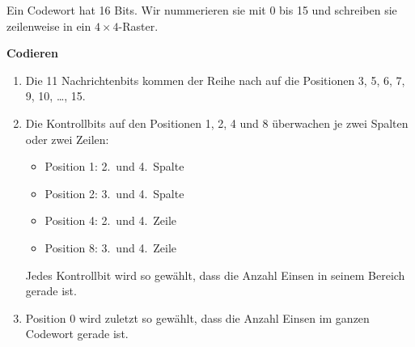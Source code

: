 \begin{myprocedure}\label{proc:hamming}
    Ein Codewort hat 16 Bits. Wir nummerieren sie mit 0 bis 15 und
    schreiben sie zeilenweise in ein \(4\times 4\)-Raster.

    \begin{center}
    \end{center}

    \textbf{Codieren}
    \begin{enumerate}
        \item Die 11 Nachrichtenbits kommen der Reihe nach auf die
              Positionen 3, 5, 6, 7, 9, 10, \ldots, 15.
        \item Die Kontrollbits auf den Positionen 1, 2, 4 und 8
              überwachen je zwei Spalten oder zwei Zeilen:
              \begin{itemize}
                  \item Position 1: 2.\ und 4.\ Spalte
                  \item Position 2: 3.\ und 4.\ Spalte
                  \item Position 4: 2.\ und 4.\ Zeile
                  \item Position 8: 3.\ und 4.\ Zeile
              \end{itemize}
              Jedes Kontrollbit wird so gewählt, dass die Anzahl
              Einsen in seinem Bereich gerade ist.
        \item Position 0 wird zuletzt so gewählt, dass die Anzahl
              Einsen im ganzen Codewort gerade ist.
    \end{enumerate}


\end{myprocedure}
